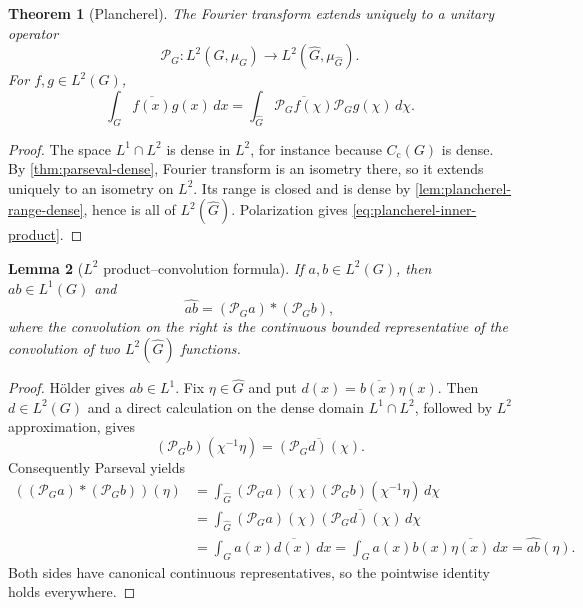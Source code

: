 \documentclass[11pt]{article}
\newtheorem{theorem}{Theorem}[section]
\newtheorem{lemma}[theorem]{Lemma}
\theoremstyle{definition}
\theoremstyle{remark}
\newcommand{\Cc}{C_{\mathrm c}}
\newcommand{\Lp}[1]{L^{#1}}
\newcommand{\dual}[1]{\widehat{#1}}
\begin{document}
\begin{theorem}[Plancherel]
\label{thm:plancherel}
The Fourier transform extends uniquely to a unitary operator
\[
  \mathcal P_G:\Lp2(G,\mu_G)\longrightarrow
     \Lp2(\dual G,\mu_{\dual G}).
\]
For $f,g\in\Lp2(G)$,
\begin{equation}
  \int_G\overline{f(x)}g(x)\,dx
  =\int_{\dual G}\overline{\mathcal P_Gf(\chi)}
      \mathcal P_Gg(\chi)\,d\chi.
  \label{eq:plancherel-inner-product}
\end{equation}
\end{theorem}

\begin{proof}
The space $\Lp1\cap\Lp2$ is dense in $\Lp2$, for instance because $\Cc(G)$ is dense.
By \cref{thm:parseval-dense}, Fourier transform is an isometry there, so it extends
uniquely to an isometry on $\Lp2$.  Its range is closed and is dense by
\cref{lem:plancherel-range-dense}, hence is all of $\Lp2(\dual G)$.  Polarization gives
\eqref{eq:plancherel-inner-product}.
\end{proof}

\begin{lemma}[$\Lp2$ product--convolution formula]
\label{lem:l2-product-convolution}
If $a,b\in\Lp2(G)$, then $ab\in\Lp1(G)$ and
\begin{equation}
  \widehat{ab}=(\mathcal P_Ga)*(\mathcal P_Gb),
  \label{eq:l2-product-convolution}
\end{equation}
where the convolution on the right is the continuous bounded representative of the
convolution of two $\Lp2(\dual G)$ functions.
\end{lemma}

\begin{proof}
H\"older gives $ab\in\Lp1$.  Fix $\eta\in\dual G$ and put
$d(x)=\overline{b(x)}\eta(x)$.  Then $d\in\Lp2(G)$ and a direct calculation on the dense
domain $\Lp1\cap\Lp2$, followed by $\Lp2$ approximation, gives
\[
  (\mathcal P_Gb)(\chi^{-1}\eta)
  =\overline{(\mathcal P_Gd)(\chi)}.
\]
Consequently Parseval yields
\begin{align*}
 ((\mathcal P_Ga)*(\mathcal P_Gb))(\eta)
 &=\int_{\dual G}(\mathcal P_Ga)(\chi)
      (\mathcal P_Gb)(\chi^{-1}\eta)\,d\chi\\
 &=\int_{\dual G}(\mathcal P_Ga)(\chi)
      \overline{(\mathcal P_Gd)(\chi)}\,d\chi\\
 &=\int_Ga(x)\overline{d(x)}\,dx
   =\int_Ga(x)b(x)\overline{\eta(x)}\,dx
   =\widehat{ab}(\eta).
\end{align*}
Both sides have canonical continuous representatives, so the pointwise identity holds
everywhere.
\end{proof}
\end{document}
